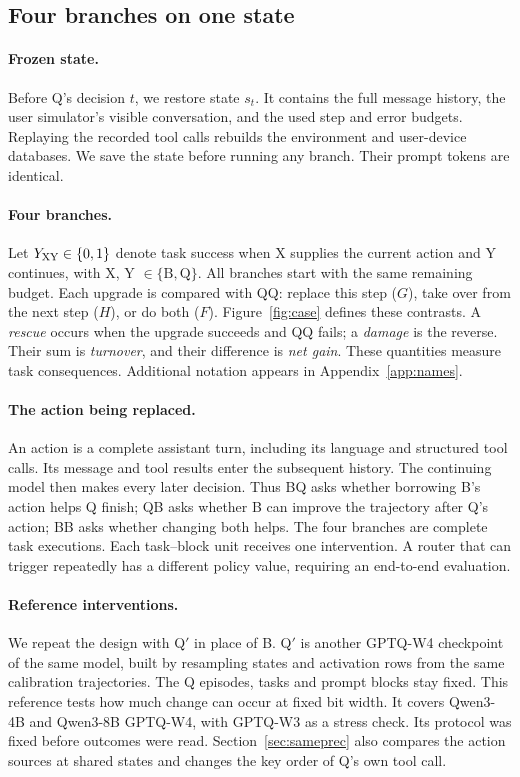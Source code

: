 \subsection{Four branches on one state}
\label{sec:estimands}

\paragraph{Frozen state.} Before Q's decision $t$, we restore state $s_t$. It contains the full message history, the user simulator's visible conversation, and the used step and error budgets. Replaying the recorded tool calls rebuilds the environment and user-device databases. We save the state before running any branch. Their prompt tokens are identical.

\paragraph{Four branches.} Let $Y_{\mathrm{XY}}\in\{0,1\}$ denote task success when X supplies the current action and Y continues, with X, Y $\in\{\mathrm{B},\mathrm{Q}\}$. All branches start with the same remaining budget. Each upgrade is compared with QQ: replace this step ($G$), take over from the next step ($H$), or do both ($F$). Figure~\ref{fig:case} defines these contrasts. %
A \emph{rescue} occurs when the upgrade succeeds and QQ fails; a \emph{damage} is the reverse. Their sum is \emph{turnover}, and their difference is \emph{net gain}. These quantities measure task consequences. Additional notation appears in Appendix~\ref{app:names}.

\paragraph{The action being replaced.} An action is a complete assistant turn, including its language and structured tool calls. Its message and tool results enter the subsequent history. The continuing model then makes every later decision. Thus BQ asks whether borrowing B's action helps Q finish; QB asks whether B can improve the trajectory after Q's action; BB asks whether changing both helps. The four branches are complete task executions. Each task--block unit receives one intervention. A router that can trigger repeatedly has a different policy value, requiring an end-to-end evaluation.

\paragraph{Reference interventions.} We repeat the design with Q$'$ in place of B. Q$'$ is another GPTQ-W4 checkpoint of the same model, built by resampling states and activation rows from the same calibration trajectories. The Q episodes, tasks and prompt blocks stay fixed. This reference tests how much change can occur at fixed bit width. It covers Qwen3-4B and Qwen3-8B GPTQ-W4, with GPTQ-W3 as a stress check. Its protocol was fixed before outcomes were read. Section~\ref{sec:sameprec} also compares the action sources at shared states and changes the key order of Q's own tool call.

